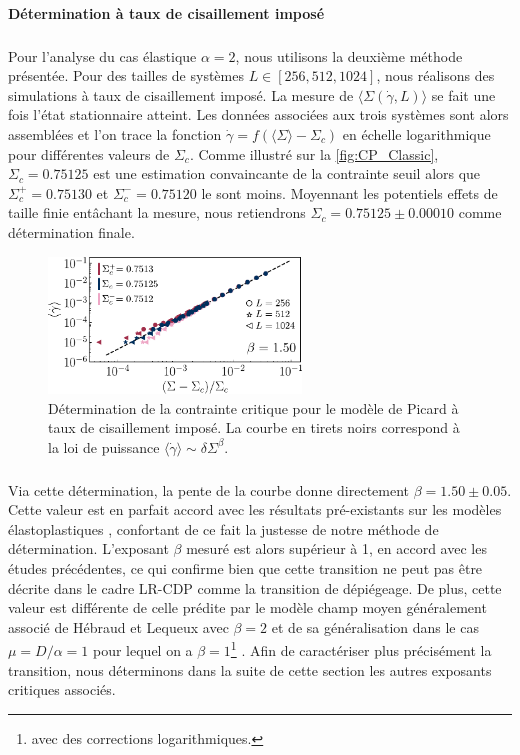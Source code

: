 \paragraph{Détermination à taux de cisaillement imposé}

\label{sec:CP_Picard}

\subparagraph{}Pour l'analyse du cas élastique $\alpha = 2$, nous utilisons la deuxième méthode présentée. Pour des tailles de systèmes $L \in [256, 512, 1024]$, nous réalisons des simulations à taux de cisaillement imposé. La mesure de $\langle \Sigma (\dot{\gamma},L)\rangle$ se fait une fois l'état stationnaire atteint. Les données associées aux trois systèmes sont alors assemblées et l'on trace la fonction $\dot{\gamma} = f(\langle \Sigma \rangle - \Sigma_c)$ en échelle logarithmique pour différentes valeurs de $\Sigma_c$. Comme illustré sur la \autoref{fig:CP_Classic}, $\Sigma_c=0.75125$ est une estimation convaincante de la contrainte seuil alors que $\Sigma_c^+=0.75130$ et $\Sigma_c^-=0.75120$ le sont moins. Moyennant les potentiels effets de taille finie entâchant la mesure, nous retiendrons $\Sigma_c=0.75125 \pm 0.00010$ comme détermination finale.

\begin{figure}[h]
	\centering
	\includegraphics[width=0.6\textwidth]{Chapitre4/Figures/CasPhysique/CP_Classic.pdf}
	\caption{Détermination de la contrainte critique pour le modèle de Picard à taux de cisaillement imposé. La courbe en tirets noirs correspond à la loi de puissance $\langle\dot{\gamma}\rangle \sim \delta\Sigma^\beta$.}
	\label{fig:CP_Classic}
\end{figure}

\subparagraph{}Via cette détermination, la pente de la courbe donne directement $\beta=1.50 \pm 0.05$. Cette valeur est en parfait accord avec les résultats pré-existants sur les modèles élastoplastiques \cite{ferrero_criticality_2019, lin_scaling_2014}, confortant de ce fait la justesse de notre méthode de détermination. L'exposant $\beta$ mesuré est alors supérieur à 1, en accord avec les études précédentes, ce qui confirme bien que cette transition ne peut pas être décrite dans le cadre LR-CDP comme la transition de dépiégeage. De plus, cette valeur est différente de celle prédite par le modèle champ moyen généralement associé de Hébraud et Lequeux avec $\beta=2$ \cite{hebraud_mode-coupling_1998} et de sa généralisation dans le cas $\mu = D/\alpha = 1$ pour lequel on a $\beta = 1$\footnote{avec des corrections logarithmiques.} \cite{lin_mean-field_2016}. Afin de caractériser plus précisément la transition, nous déterminons dans la suite de cette section les autres exposants critiques associés.

